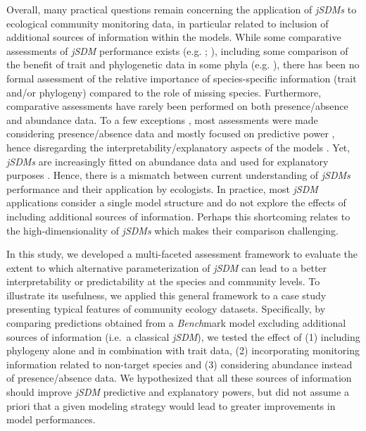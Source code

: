 \begin{refsection}
Overall, many practical questions remain concerning the application of
\emph{jSDMs} to ecological community monitoring data, in particular
related to inclusion of additional sources of information within the
models. While some comparative assessments of \emph{jSDM} performance
exists (e.g. \textcite{Norberg_2019} ; \textcite{Wilkinson_2020}),
including some comparison of the benefit of trait and phylogenetic data
in some phyla (e.g. \textcite{Abrego_2022}), there has been no formal
assessment of the relative importance of species-specific information
(trait and/or phylogeny) compared to the role of missing species.
Furthermore, comparative assessments have rarely been performed on both
presence/absence and abundance data. To a few exceptions
\autocite{Waldock_2022}, most assessments were made considering
presence/absence data \autocites[ ]{Norberg_2019}{Wilkinson_2019} and
mostly focused on predictive power \autocites[
]{Norberg_2019}{Wilkinson_2019}, hence disregarding the
interpretability/explanatory aspects of the models
\autocite{Tredennick_2021}. Yet, \emph{jSDMs} are increasingly fitted on
abundance data \autocite{Brimacombe_2020} and used for explanatory
purposes \autocite{Abrego_2016}. Hence, there is a mismatch between
current understanding of \emph{jSDMs} performance and their application
by ecologists. In practice, most \emph{jSDM} applications consider a
single model structure and do not explore the effects of including
additional sources of information. Perhaps this shortcoming relates to
the high-dimensionality of \emph{jSDMs} which makes their comparison
challenging.

In this study, we developed a multi-faceted assessment framework to
evaluate the extent to which alternative parameterization of \emph{jSDM}
can lead to a better interpretability or predictability at the species
and community levels. To illustrate its usefulness, we applied this
general framework to a case study presenting typical features of
community ecology datasets. Specifically, by comparing predictions
obtained from a \emph{Bench}mark model excluding additional sources of
information (i.e.~a classical \emph{jSDM}), we tested the effect of (1)
including phylogeny alone and in combination with trait data, (2)
incorporating monitoring information related to non-target species and
(3) considering abundance instead of presence/absence data. We
hypothesized that all these sources of information should improve
\emph{jSDM} predictive and explanatory powers, but did not assume a
priori that a given modeling strategy would lead to greater improvements
in model performances.


\end{refsection}
